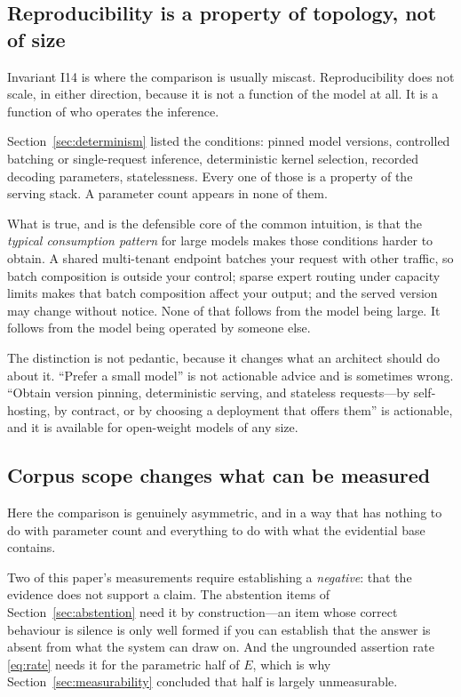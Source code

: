 \subsection{Reproducibility is a property of topology, not of size}

Invariant I14 is where the comparison is usually miscast. Reproducibility does not
scale, in either direction, because it is not a function of the model at all. It is a
function of who operates the inference.

Section~\ref{sec:determinism} listed the conditions: pinned model versions,
controlled batching or single-request inference, deterministic kernel selection,
recorded decoding parameters, statelessness. Every one of those is a property of the
serving stack. A parameter count appears in none of them.

What is true, and is the defensible core of the common intuition, is that the
\emph{typical consumption pattern} for large models makes those conditions harder to
obtain. A shared multi-tenant endpoint batches your request with other traffic, so
batch composition is outside your control; sparse expert routing under capacity
limits makes that batch composition affect your output; and the served version may
change without notice. None of that follows from the model being large. It follows
from the model being operated by someone else.

The distinction is not pedantic, because it changes what an architect should do about
it. ``Prefer a small model'' is not actionable advice and is sometimes wrong.
``Obtain version pinning, deterministic serving, and stateless requests---by
self-hosting, by contract, or by choosing a deployment that offers them'' is
actionable, and it is available for open-weight models of any size.

\subsection{Corpus scope changes what can be measured}
\label{sec:corpus-scope}

Here the comparison is genuinely asymmetric, and in a way that has nothing to do with
parameter count and everything to do with what the evidential base contains.

Two of this paper's measurements require establishing a \emph{negative}: that the
evidence does not support a claim. The abstention items of
Section~\ref{sec:abstention} need it by construction---an item whose correct
behaviour is silence is only well formed if you can establish that the answer is
absent from what the system can draw on. And the ungrounded assertion rate
\eqref{eq:rate} needs it for the parametric half of $E$, which is why
Section~\ref{sec:measurability} concluded that half is largely unmeasurable.

